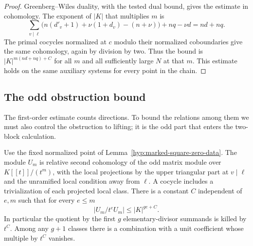 \begin{proof}
Greenberg--Wiles duality, with the tested dual bound,
gives the estimate in cohomology. The exponent of
\(|K|\) that multiplies \(m\) is
\[
  \sum_{v\mid\ell}
    \bigl(n(d'_v+1)+\nu(1+d_v)-(n+\nu)\bigr)
     +nq-\nu d=nd+nq .
\]
The primal cocycles normalized at \(c\) modulo their
normalized coboundaries give the same cohomology,
again by division by two. Thus the bound is
\(|K|^{m(nd+nq)+C}\) for all \(m\) and all sufficiently
large \(N\) at that \(m\). This estimate holds on the same auxiliary systems for every point in the chain.

\end{proof}

\subsection{The odd obstruction bound}
\label{subsec:odd-obstruction}

The first-order estimate counts directions. To bound the relations among them we must
also control the obstruction to lifting; it is the odd part that enters the two-block
calculation.

\begin{proposition}
\label{prop:marked-odd-obstruction-bound}
Use the fixed normalized point of Lemma~\ref{hyp:marked-square-zero-data}.
The module \(U_m\) is relative second cohomology of the odd matrix
module over \(K[[t]]/(t^m)\), with the local projections by the upper
triangular part at \(v\mid\ell\) and the unramified local condition
away from \(\ell\). A cocycle includes a trivialization of each
projected local class. There is a constant \(C\) independent of \(e,m\)
such that for every \(e\le m\)
\[
                  |U_m/t^e U_m|\le |K|^{ge+C}.
\]
In particular the quotient by the first \(g\) elementary-divisor
summands is killed by \(t^C\). Among any \(g+1\) classes there is
a combination with a unit coefficient whose multiple by \(t^C\)
vanishes.
\end{proposition}

